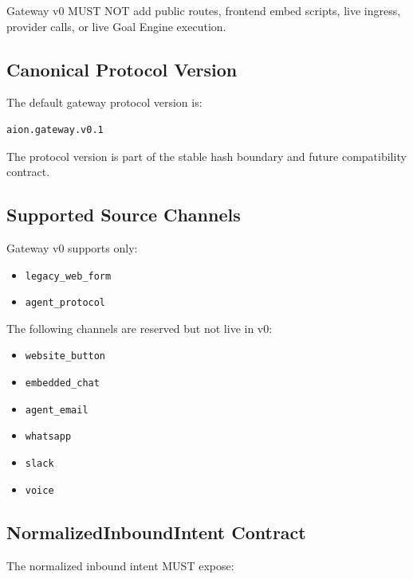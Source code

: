 Gateway v0 MUST NOT add public routes, frontend embed scripts, live ingress, provider calls, or live Goal Engine execution.

\subsection{Canonical Protocol Version}

The default gateway protocol version is:

\begin{verbatim}
aion.gateway.v0.1
\end{verbatim}

The protocol version is part of the stable hash boundary and future compatibility contract.

\subsection{Supported Source Channels}

Gateway v0 supports only:

\begin{itemize}
  \item \texttt{legacy\_web\_form}
  \item \texttt{agent\_protocol}
\end{itemize}

The following channels are reserved but not live in v0:

\begin{itemize}
  \item \texttt{website\_button}
  \item \texttt{embedded\_chat}
  \item \texttt{agent\_email}
  \item \texttt{whatsapp}
  \item \texttt{slack}
  \item \texttt{voice}
\end{itemize}

\subsection{NormalizedInboundIntent Contract}

The normalized inbound intent MUST expose:

